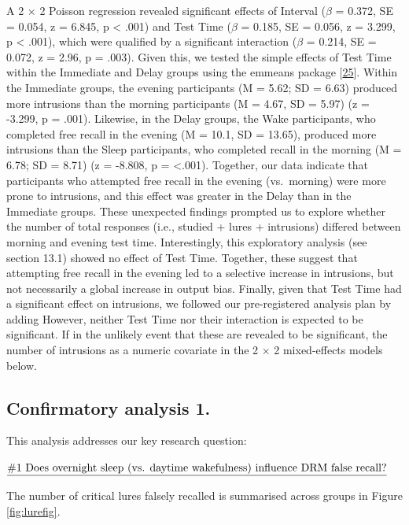 \documentclass[
]{article}
\begin{document}
A 2 \(\times\) 2 Poisson regression revealed significant effects of Interval (\(\beta\) = 0.372, SE = 0.054, z = 6.845, p \textless{} .001) and Test Time (\(\beta\) = 0.185, SE = 0.056, z = 3.299, p \textless{} .001), which were qualified by a significant interaction (\(\beta\) = 0.214, SE = 0.072, z = 2.96, p = .003). Given this, we tested the simple effects of Test Time within the Immediate and Delay groups using the emmeans package {[}\protect\hyperlink{ref-lenth2021a}{25}{]}. Within the Immediate groups, the evening participants (M = 5.62; SD = 6.63) produced more intrusions than the morning participants (M = 4.67, SD = 5.97) (z = -3.299, p = .001). Likewise, in the Delay groups, the Wake participants, who completed free recall in the evening (M = 10.1, SD = 13.65), produced more intrusions than the Sleep participants, who completed recall in the morning (M = 6.78; SD = 8.71) (z = -8.808, p = \textless.001). Together, our data indicate that participants who attempted free recall in the evening (vs.~morning) were more prone to intrusions, and this effect was greater in the Delay than in the Immediate groups. These unexpected findings prompted us to explore whether the number of total responses (i.e., studied + lures + intrusions) differed between morning and evening test time. Interestingly, this exploratory analysis (see section 13.1) showed no effect of Test Time. Together, these suggest that attempting free recall in the evening led to a selective increase in intrusions, but not necessarily a global increase in output bias. Finally, given that Test Time had a significant effect on intrusions, we followed our pre-registered analysis plan by adding However, neither Test Time nor their interaction is expected to be significant. If in the unlikely event that these are revealed to be significant, the number of intrusions as a numeric covariate in the 2 \(\times\) 2 mixed-effects models below.

\hypertarget{confirmatory-analysis-1.}{%
\subsection{Confirmatory analysis 1.}\label{confirmatory-analysis-1.}}

This analysis addresses our key research question:

\(\text{\underline{\#1 Does overnight sleep (vs. daytime wakefulness) influence DRM false recall?}}\)

The number of critical lures falsely recalled is summarised across groups in Figure \ref{fig:lurefig}.
\end{document}
